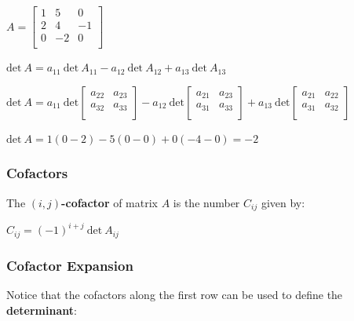 \documentclass[12pt, letterpaper]{article}
\begin{document}
\medskip
{\centering

  $ A =
  \begin{bmatrix}
    1 & 5 & 0 \\
    2 & 4 & -1 \\
    0 & -2 & 0 \\
  \end{bmatrix} $
  \medskip

  $ \textrm{det} \: A = a_{11} \: \textrm{det} \: A_{11} - a_{12} \:
  \textrm{det} \: A_{12} + a_{13} \: \textrm{det} \: A_{13} $
  \medskip

  $ \textrm{det} \: A = a_{11}
  \: \textrm{det}
  \begin{bmatrix}
    a_{22} & a_{23} \\
    a_{32} & a_{33} \\
  \end{bmatrix}
  - a_{12}
  \: \textrm{det}
  \begin{bmatrix}
    a_{21} & a_{23} \\
    a_{31} & a_{33} \\
  \end{bmatrix}
  + a_{13}
  \: \textrm{det}
  \begin{bmatrix}
    a_{21} & a_{22} \\
    a_{31} & a_{32} \\
  \end{bmatrix} $

  \medskip

  $ \textrm{det} \: A = 1(0 - 2) - 5(0 - 0) + 0(-4 - 0) = -2 $

}
\medskip

\subsubsection*{Cofactors}

The \textbf{$ (i, j) $-cofactor} of matrix $ A $ is the number $
C_{ij} $ given by:

\medskip
{\centering

  $ C_{ij} = (-1)^{i + j} \: \textrm{det} \: A_{ij} $

}
\medskip

\subsubsection*{Cofactor Expansion}

Notice that the cofactors along the first row can be used to define
the \textbf{determinant}:
\end{document}
